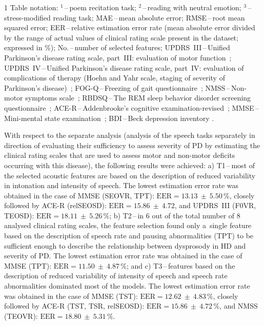 \begin{table}[htb!]
\begin{threeparttable}
		\begin{tablenotes}
		\scriptsize
			\item[1] Table notation: $^{1}$\,--\,poem recitation task; $^{2}$\,--\,reading with neutral emotion; $^{3}$\,--\,stress-modified reading task; MAE\,--\,mean absolute error; RMSE\,--\,root mean squared error; EER\,--\,relative estimation error rate (mean absolute error divided by the range of actual values of clinical rating scale present in the dataset; expressed in $\%$); No.\,--\,number of selected features; UPDRS~III\,--\,Unified Parkinson's disease rating scale, part~III: evaluation of motor function~\cite{Fahn1987}; UPDRS~IV\,--\,Unified Parkinson's disease rating scale, part~IV: evaluation of complications of therapy (Hoehn and Yahr scale, staging of severity of Parkinson's disease)~\cite{Fahn1987}; FOG-Q\,--\,Freezing of gait questionnaire~\cite{Giladi2000}; NMSS\,--\,Non-motor symptoms scale~\cite{Chaudhuri2007}; RBDSQ\,--\,The REM sleep behavior disorder screening questionnaire~\cite{Stiasny2007}; ACE-R\,--\,Addenbrooke's cognitive examination-revised~\cite{Larner2007}; MMSE\,--\,Mini-mental state examination~\cite{Folstein1975}; BDI\,--\,Beck depression inventory \cite{Beck2000, Beck1961}.
		\end{tablenotes}
	\end{threeparttable}
\end{table}

With respect to the separate analysis (analysis of the speech tasks separately in direction of evaluating their sufficiency to assess severity of PD by estimating the clinical rating scales that are used to assess motor and non-motor deficits occurring with this disease), the following results were achieved: a) T1\,--\,most of the selected acoustic features are based on the description of reduced variability in intonation and intensity of speech. The lowest estimation error rate was obtained in the case of MMSE (SEOVR, TPT): $\mbox{EER}=13.13~\pm~5.50\,\%$, closely followed by ACE-R (relSEOSD): $\mbox{EER}=15.86~\pm~4.72$, and UPDRS~III (F0VR, TEOSD): $\mbox{EER}=18.11~\pm~5.26\,\%$; b) T2\,--\,in $6$ out of the total number of $8$ analysed clinical rating scales, the feature selection found only a~single feature based on the description of speech rate and pausing abnormalities (TPT) to be sufficient enough to describe the relationship between dysprosody in HD and severity of PD. The lowest estimation error rate was obtained in the case of MMSE (TPT): $\mbox{EER}=11.50~\pm~4.87\,\%$; and c) T3\,--\,features based on the description of reduced variability of intensity of speech and speech rate abnormalities dominated most of the models. The lowest estimation error rate was obtained in the case of MMSE (TST): $\mbox{EER}=12.62~\pm~4.83\,\%$, closely followed by ACE-R (TST, TSR, relSEOSD): $\mbox{EER}=15.86~\pm~4.72\,\%$, and NMSS (TEOVR): $\mbox{EER}=18.80~\pm~5.31\,\%$.

